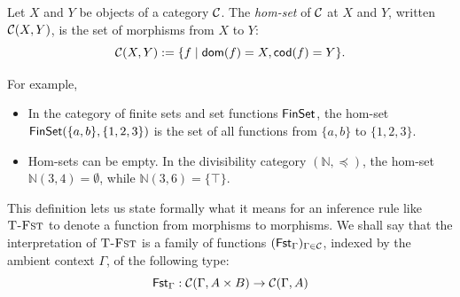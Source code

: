 \begin{definition}
  Let \(X\) and \(Y\) be objects of a category \(\mathcal C\).
  The \emph{hom-set} of $\mathcal C$ at $X$ and $Y$, 
  written \(\mathcal C(X,Y)\),
  is the set of morphisms from \(X\) to \(Y\):
  \[
  \mathcal C(X,Y) := \{f \mid \operatorname{\mathsf{dom}}(f) = X, \operatorname{\mathsf{cod}}(f) = Y\}.
  \]
\end{definition}
For example, \begin{itemize}
\item In the category of finite sets and set functions $\mathsf{FinSet}$, the
  hom-set $\mathsf{FinSet}(\{a,b\}, \{1, 2, 3\})$ is the set of all functions
  from $\{a,b\}$ to $\{1, 2, 3\}$.
\item Hom-sets can be empty. In the divisibility category $(\mathbb{N}, \preceq)$,
the hom-set $\mathbb{N}(3,4) = \emptyset$, while $\mathbb{N}(3, 6) = \{\top\}$.
\end{itemize}
This definition lets us state formally what it means for an inference rule
like \(\textsc{T-Fst}\) to denote a function from morphisms to morphisms.
We shall say that the interpretation of \(\textsc{T-Fst}\) is
a family of functions \((\mathsf{Fst}_\Gamma)_{\Gamma\in\mathcal C}\),
indexed by the ambient context \(\Gamma\),
of the following type:
\[
\mathsf{Fst}_\Gamma : \mathcal C(\Gamma, A \times B) \to \mathcal C(\Gamma, A)
\]

